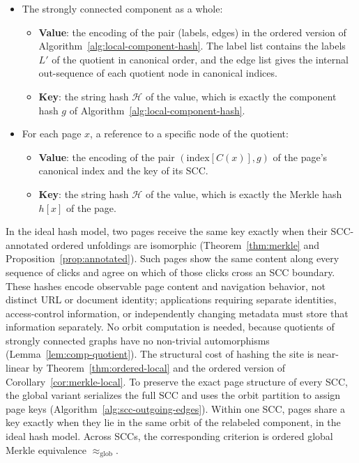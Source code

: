 \documentclass[twoside,leqno]{article}
\newcommand{\eqg}{\approx_{\mathrm{glob}}}
\begin{document}
\begin{itemize}
  \item The strongly connected component as a whole: \begin{itemize}
    \item \textbf{Value}: the encoding of the pair (labels, edges) in the ordered version of Algorithm~\ref{alg:local-component-hash}. The label list contains the labels $L'$ of the quotient in canonical order, and the edge list gives the internal out-sequence of each quotient node in canonical indices.
    \item \textbf{Key}: the string hash $\mathcal{H}$ of the value, which is exactly the component hash $g$ of Algorithm~\ref{alg:local-component-hash}.
  \end{itemize}
  \item For each page $x$, a reference to a specific node of the quotient: \begin{itemize}
    \item \textbf{Value}: the encoding of the pair $(\text{index}[C(x)], g)$ of the page's canonical index and the key of its SCC.
    \item \textbf{Key}: the string hash $\mathcal{H}$ of the value, which is exactly the Merkle hash $h[x]$ of the page.
  \end{itemize}
\end{itemize}

In the ideal hash model, two pages receive the same key exactly when their SCC-annotated ordered unfoldings are isomorphic (Theorem~\ref{thm:merkle} and Proposition~\ref{prop:annotated}). Such pages show the same content along every sequence of clicks and agree on which of those clicks cross an SCC boundary. These hashes encode observable page content and navigation behavior, not distinct URL or document identity; applications requiring separate identities, access-control information, or independently changing metadata must store that information separately. No orbit computation is needed, because quotients of strongly connected graphs have no non-trivial automorphisms (Lemma~\ref{lem:comp-quotient}). The structural cost of hashing the site is near-linear by Theorem~\ref{thm:ordered-local} and the ordered version of Corollary~\ref{cor:merkle-local}. To preserve the exact page structure of every SCC, the global variant serializes the full SCC and uses the orbit partition to assign page keys (Algorithm~\ref{alg:scc-outgoing-edges}). Within one SCC, pages share a key exactly when they lie in the same orbit of the relabeled component, in the ideal hash model. Across SCCs, the corresponding criterion is ordered global Merkle equivalence $\eqg$.
\end{document}
